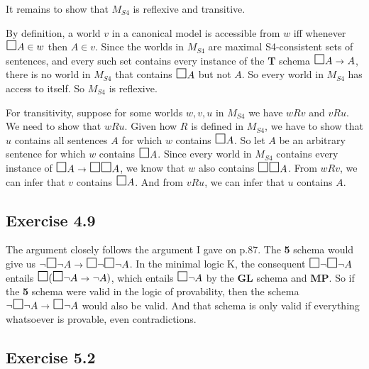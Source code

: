\documentclass{scrartcl}
\let\oldbox\Box
\renewcommand\Box{\scaleobj{1.2}{\oldbox}}
\let\oldto\to
\renewcommand\to{\scaleobj{0.95}{\,\oldto\,}}
\begin{document}
  It remains to show that $M_{S4}$ is reflexive and transitive.

  By definition, a world $v$ in a canonical model is accessible from $w$ iff
  whenever $\Box A \in w$ then $A \in v$. Since the worlds in $M_{S4}$ are
  maximal S4-consistent sets of sentences, and every such set contains every
  instance of the \textbf{T} schema $\Box A \to A$, there is no world in
  $M_{S4}$ that contains $\Box A$ but not $A$. So every world in $M_{S4}$ has
  access to itself. So $M_{S4}$ is reflexive.

  For transitivity, suppose for some worlds $w,v,u$ in $M_{S4}$ we have $wRv$
  and $vRu$. We need to show that $wRu$. Given how $R$ is defined in $M_{S4}$,
  we have to show that $u$ contains all sentences $A$ for which $w$ contains
  $\Box A$. So let $A$ be an arbitrary sentence for which $w$ contains $\Box
  A$. Since every world in $M_{S4}$ contains every instance of
  $\Box A \to \Box\Box A$, we know that $w$ also contains $\Box\Box A$. From
  $wRv$, we can infer that $v$ contains $\Box A$. And from $vRu$, we can infer
  that $u$ contains $A$.

  \subsection*{Exercise 4.9}

%
%
  The argument closely follows the argument I gave on
  p.87. The \textbf{5} schema would give us
  $\neg \Box \neg A \to \Box \neg \Box \neg A$. In the minimal logic
  K, the consequent $\Box \neg \Box \neg A$ entails
  $\Box(\Box \neg A \to \neg A)$, which entails $\Box \neg A$ by the
  \textbf{GL} schema and \textbf{MP}. So if the \textbf{5} schema were
  valid in the logic of provability, then the schema
  $\neg \Box \neg A \to \Box \neg A$ would also be valid. And that
  schema is only valid if everything whatsoever is provable, even
  contradictions.

\subsection*{Exercise 5.2}
\end{document}
